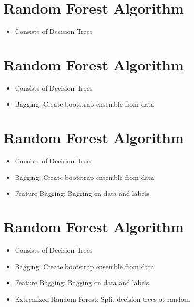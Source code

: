 \documentclass[11pt]{article}
\begin{document}
\newpage
\hypertarget{random-forest-algorithm}{%
\section*{Random Forest Algorithm}\label{random-forest-algorithm}}

\begin{itemize}
    \item Consists of Decision Trees
\end{itemize}

\newpage
\hypertarget{random-forest-algorithm}{%
\section*{Random Forest Algorithm}\label{random-forest-algorithm2}}

\begin{itemize}
    \item Consists of Decision Trees
    \item Bagging: Create bootstrap ensemble from data
\end{itemize}

\newpage
\hypertarget{random-forest-algorithm}{%
\section*{Random Forest Algorithm}\label{random-forest-algorithm1}}

\begin{itemize}
    \item Consists of Decision Trees
    \item Bagging: Create bootstrap ensemble from data
    \item Feature Bagging: Bagging on data and labels
\end{itemize}

\newpage
\hypertarget{random-forest-algorithm}{%
\section*{Random Forest Algorithm}\label{random-forest-algorithm4}}

\begin{itemize}
    \item Consists of Decision Trees
    \item Bagging: Create bootstrap ensemble from data
    \item Feature Bagging: Bagging on data and labels
    \item Extremized Random Forest: Split decision trees at random
\end{itemize}
\end{document}
